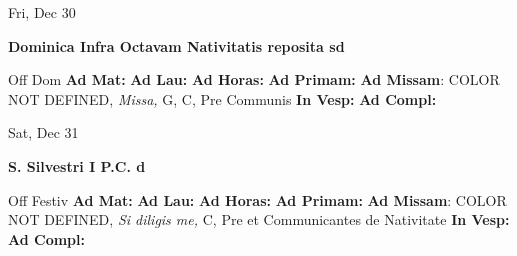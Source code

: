 \documentclass[10pt]{memoir}
\begin{document}
\begin{center}
\begin{minipage}{3.5in}
\vspace{2em}
\begin{center}Fri, Dec 30
\end{center}
\textbf{ \large Dominica Infra Octavam Nativitatis reposita
\textnormal{\normalsize sd}}

\begin{justify}Off Dom
\textbf{Ad Mat: }
\textbf{Ad Lau: }
\textbf{Ad Horas: }
\textbf{Ad Primam: }\textbf{Ad Missam}: COLOR NOT DEFINED, \textit{Missa,} G, C, Pre Communis
\textbf{In Vesp: }
\textbf{Ad Compl: }
\end{justify}
\end{minipage}
\end{center}

\begin{center}
\begin{minipage}{3.5in}
\vspace{2em}
\begin{center}Sat, Dec 31
\end{center}
\textbf{ \large S. Silvestri I P.C.
\textnormal{\normalsize d}}

\begin{justify}Off Festiv
\textbf{Ad Mat: }
\textbf{Ad Lau: }
\textbf{Ad Horas: }
\textbf{Ad Primam: }\textbf{Ad Missam}: COLOR NOT DEFINED, \textit{Si diligis me,} C, Pre et Communicantes de Nativitate
\textbf{In Vesp: }
\textbf{Ad Compl: }
\end{justify}
\end{minipage}
\end{center}
\end{document}
